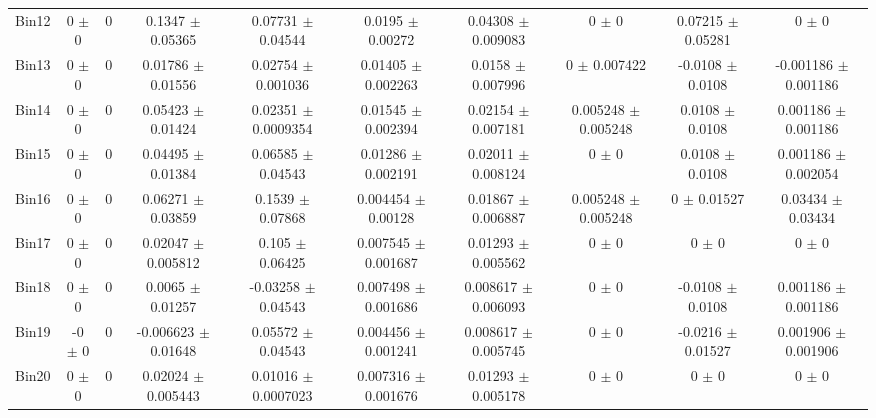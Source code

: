 \begin{tabular}{@{\extracolsep{4pt}}lccccccccc@{}}
     Bin12 & 0 $\pm$ 0 & 0 & 0.1347 $\pm$ 0.05365 & 0.07731 $\pm$ 0.04544 & 0.0195 $\pm$ 0.00272 & 0.04308 $\pm$ 0.009083 & 0 $\pm$ 0 & 0.07215 $\pm$ 0.05281 & 0 $\pm$ 0 \\ 
     Bin13 & 0 $\pm$ 0 & 0 & 0.01786 $\pm$ 0.01556 & 0.02754 $\pm$ 0.001036 & 0.01405 $\pm$ 0.002263 & 0.0158 $\pm$ 0.007996 & 0 $\pm$ 0.007422 & -0.0108 $\pm$ 0.0108 & -0.001186 $\pm$ 0.001186 \\ 
     Bin14 & 0 $\pm$ 0 & 0 & 0.05423 $\pm$ 0.01424 & 0.02351 $\pm$ 0.0009354 & 0.01545 $\pm$ 0.002394 & 0.02154 $\pm$ 0.007181 & 0.005248 $\pm$ 0.005248 & 0.0108 $\pm$ 0.0108 & 0.001186 $\pm$ 0.001186 \\ 
     Bin15 & 0 $\pm$ 0 & 0 & 0.04495 $\pm$ 0.01384 & 0.06585 $\pm$ 0.04543 & 0.01286 $\pm$ 0.002191 & 0.02011 $\pm$ 0.008124 & 0 $\pm$ 0 & 0.0108 $\pm$ 0.0108 & 0.001186 $\pm$ 0.002054 \\ 
     Bin16 & 0 $\pm$ 0 & 0 & 0.06271 $\pm$ 0.03859 & 0.1539 $\pm$ 0.07868 & 0.004454 $\pm$ 0.00128 & 0.01867 $\pm$ 0.006887 & 0.005248 $\pm$ 0.005248 & 0 $\pm$ 0.01527 & 0.03434 $\pm$ 0.03434 \\ 
     Bin17 & 0 $\pm$ 0 & 0 & 0.02047 $\pm$ 0.005812 & 0.105 $\pm$ 0.06425 & 0.007545 $\pm$ 0.001687 & 0.01293 $\pm$ 0.005562 & 0 $\pm$ 0 & 0 $\pm$ 0 & 0 $\pm$ 0 \\ 
     Bin18 & 0 $\pm$ 0 & 0 & 0.0065 $\pm$ 0.01257 & -0.03258 $\pm$ 0.04543 & 0.007498 $\pm$ 0.001686 & 0.008617 $\pm$ 0.006093 & 0 $\pm$ 0 & -0.0108 $\pm$ 0.0108 & 0.001186 $\pm$ 0.001186 \\ 
     Bin19 & -0 $\pm$ 0 & 0 & -0.006623 $\pm$ 0.01648 & 0.05572 $\pm$ 0.04543 & 0.004456 $\pm$ 0.001241 & 0.008617 $\pm$ 0.005745 & 0 $\pm$ 0 & -0.0216 $\pm$ 0.01527 & 0.001906 $\pm$ 0.001906 \\ 
     Bin20 & 0 $\pm$ 0 & 0 & 0.02024 $\pm$ 0.005443 & 0.01016 $\pm$ 0.0007023 & 0.007316 $\pm$ 0.001676 & 0.01293 $\pm$ 0.005178 & 0 $\pm$ 0 & 0 $\pm$ 0 & 0 $\pm$ 0 \\ 
\hline\hline
  \end{tabular}
